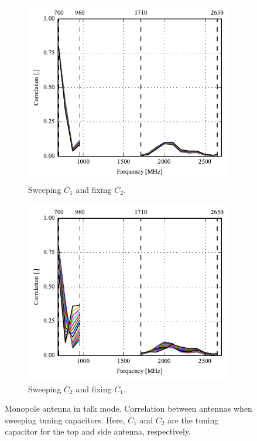 \begin{figure}[htbp]
    \centering
    \begin{subfigure}{0.49\linewidth}
        \includegraphics{img/tech_sol/monopole/talk_mode/s11_corr}
        \caption{Sweeping $C_1$ and fixing $C_2$.}
    \end{subfigure}
    \hfill
    \begin{subfigure}{0.49\linewidth}
        \includegraphics{img/tech_sol/monopole/talk_mode/s22_corr}
        \caption{Sweeping $C_2$ and fixing $C_1$.}
    \end{subfigure}
    \caption{Monopole antenna in talk mode. Correlation between antennas when sweeping tuning capacitors. Here, $C_1$ and $C_2$ are the tuning capacitor for the top and side antenna, respectively.}
    \label{fig:corr_sol1_talk}
\end{figure}

